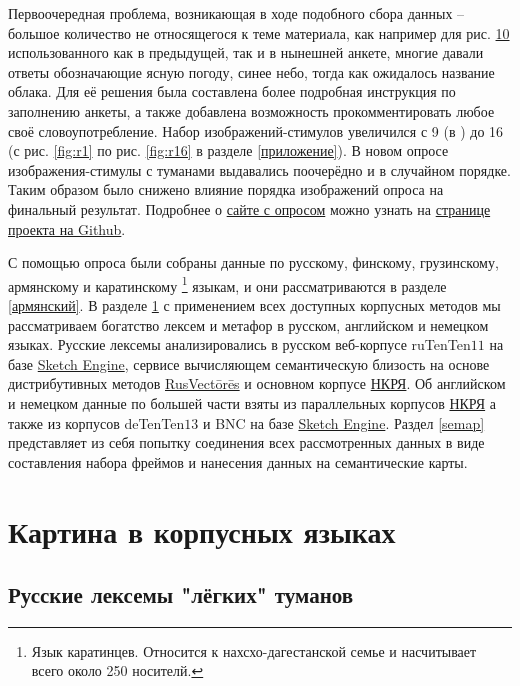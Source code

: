 \par Первоочередная проблема, возникающая в ходе подобного сбора данных – большое количество не относящегося к теме материала, как например для рис. \hyperlink{p10}{10} использованного как в предыдущей, так и в нынешней анкете, многие давали ответы обозначающие ясную погоду, синее небо, тогда как ожидалось название облака. Для её решения была составлена более подробная инструкция по заполнению анкеты, а также добавлена возможность прокомментировать любое своё словоупотребление. Набор изображений-стимулов увеличился с 9 (в \citep{соколовский2017}) до 16 (с рис. \ref{fig:r1} по рис. \ref{fig:r16} в разделе \ref{приложение}). В новом опросе изображения-стимулы с туманами выдавались поочерёдно и в случайном порядке. Таким образом было снижено влияние порядка изображений опроса на финальный результат. Подробнее о \hyperlink{form}{сайте с опросом} можно узнать на \hyperlink{github}{странице проекта на Github}.


\par С помощью опроса были собраны данные по русскому, финскому, грузинскому, армянскому и каратинскому \footnote{Язык каратинцев. Относится к нахсхо-дагестанской семье и насчитывает всего около 250 носителй.} языкам, и они рассматриваются в разделе \ref{армянский}. В разделе \ref{корпус} с применением всех доступных корпусных методов мы рассматриваем богатство лексем и метафор в русском, английском и немецком языках. Русские лексемы анализировались в русском веб-корпусе ruTenTen$11$ на базе \hyperlink{tenten}{Sketch Engine}, сервисе вычисляющем семантическую близость на основе дистрибутивных методов  \hyperlink{rusvectores}{RusVectōrēs} \citep{KutuzovKuzmenko2017} и основном корпусе \hyperlink{ruscorpora}{НКРЯ}. Об английском и немецком данные по большей части взяты из параллельных корпусов \hyperlink{ruscorpora}{НКРЯ} а также из корпусов deTenTen$13$ и BNC на базе \hyperlink{tenten}{Sketch Engine}. Раздел \ref{semap} представляет из себя попытку соединения всех рассмотренных данных в виде составления набора фреймов и нанесения данных на семантические карты.

\section{Картина в корпусных языках} \label{корпус}

\subsection{Русские лексемы "лёгких" туманов} \label{rus}

